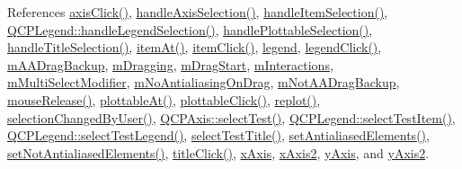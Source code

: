 References \hyperlink{a00067_source_l02527}{axis\+Click()}, \hyperlink{a00116_a6085478fe8ba07b2a192cf8217133cb3}{handle\+Axis\+Selection()}, \hyperlink{a00115_source_l07917}{handle\+Item\+Selection()}, \hyperlink{a00115_source_l03244}{Q\+C\+P\+Legend\+::handle\+Legend\+Selection()}, \hyperlink{a00115_source_l07856}{handle\+Plottable\+Selection()}, \hyperlink{a00115_source_l07994}{handle\+Title\+Selection()}, \hyperlink{a00115_source_l06924}{item\+At()}, \hyperlink{a00067_source_l02513}{item\+Click()}, \hyperlink{a00116_source_l02077}{legend}, \hyperlink{a00067_source_l02541}{legend\+Click()}, \hyperlink{a00116_source_l02138}{m\+A\+A\+Drag\+Backup}, \hyperlink{a00116_source_l02122}{m\+Dragging}, \hyperlink{a00116_source_l02134}{m\+Drag\+Start}, \hyperlink{a00116_source_l02127}{m\+Interactions}, \hyperlink{a00116_source_l02141}{m\+Multi\+Select\+Modifier}, \hyperlink{a00116_source_l02131}{m\+No\+Antialiasing\+On\+Drag}, \hyperlink{a00116_source_l02138}{m\+Not\+A\+A\+Drag\+Backup}, \hyperlink{a00067_source_l02485}{mouse\+Release()}, \hyperlink{a00115_source_l06606}{plottable\+At()}, \hyperlink{a00067_source_l02499}{plottable\+Click()}, \hyperlink{a00115_source_l07221}{replot()}, \hyperlink{a00067_source_l02569}{selection\+Changed\+By\+User()}, \hyperlink{a00115_source_l04589}{Q\+C\+P\+Axis\+::select\+Test()}, \hyperlink{a00115_source_l03183}{Q\+C\+P\+Legend\+::select\+Test\+Item()}, \hyperlink{a00115_source_l03172}{Q\+C\+P\+Legend\+::select\+Test\+Legend()}, \hyperlink{a00115_source_l08129}{select\+Test\+Title()}, \hyperlink{a00115_source_l06112}{set\+Antialiased\+Elements()}, \hyperlink{a00115_source_l06165}{set\+Not\+Antialiased\+Elements()}, \hyperlink{a00067_source_l02555}{title\+Click()}, \hyperlink{a00116_source_l02076}{x\+Axis}, \hyperlink{a00116_source_l02076}{x\+Axis2}, \hyperlink{a00116_source_l02076}{y\+Axis}, and \hyperlink{a00116_source_l02076}{y\+Axis2}.


